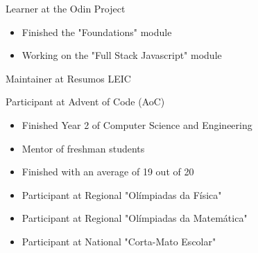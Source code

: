 \documentclass[10pt,a4paper,ragged2e,withhyper]{altacv}
\begin{document}
\begin{paracol}{2}


Learner at the Odin Project

\begin{itemize}
\item Finished the "Foundations" module 
\item Working on the "Full Stack Javascript" module
\end{itemize}


\divider

Maintainer at Resumos LEIC


\divider

Participant at Advent of Code (AoC)




\begin{itemize}
\item Finished Year 2 of Computer Science and Engineering
\item Mentor of freshman students
\end{itemize}

\divider

\begin{itemize}

\item Finished with an average of 19 out of 20
\item Participant at Regional "Olímpiadas da Física"
\item Participant at Regional "Olímpiadas da Matemática"
\item Participant at National "Corta-Mato Escolar"

\end{itemize}



\end{paracol}
\end{document}
